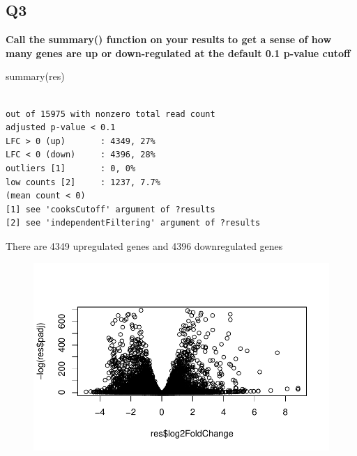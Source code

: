 \documentclass[
  letterpaper,
  DIV=11,
  numbers=noendperiod]{scrartcl}
\newenvironment{Shaded}{\begin{snugshade}}{\end{snugshade}}
\newcommand{\FunctionTok}[1]{\textcolor[rgb]{0.28,0.35,0.67}{#1}}
\newcommand{\NormalTok}[1]{\textcolor[rgb]{0.00,0.23,0.31}{#1}}
\newcommand{\SpecialCharTok}[1]{\textcolor[rgb]{0.37,0.37,0.37}{#1}}
\begin{document}
\hypertarget{q3}{%
\subsection{\texorpdfstring{\textbf{Q3}}{Q3}}\label{q3}}

\textbf{Call the summary() function on your results to get a sense of
how many genes are up or down-regulated at the default 0.1 p-value
cutoff}

\begin{Shaded}
\begin{Highlighting}[]
\FunctionTok{summary}\NormalTok{(res)}
\end{Highlighting}
\end{Shaded}

\begin{verbatim}

out of 15975 with nonzero total read count
adjusted p-value < 0.1
LFC > 0 (up)       : 4349, 27%
LFC < 0 (down)     : 4396, 28%
outliers [1]       : 0, 0%
low counts [2]     : 1237, 7.7%
(mean count < 0)
[1] see 'cooksCutoff' argument of ?results
[2] see 'independentFiltering' argument of ?results
\end{verbatim}

There are 4349 upregulated genes and 4396 downregulated genes

\begin{Shaded}
\end{Shaded}

\begin{figure}[H]

{\centering \includegraphics{Class13_files/figure-pdf/unnamed-chunk-11-1.pdf}

}

\end{figure}
\end{document}
